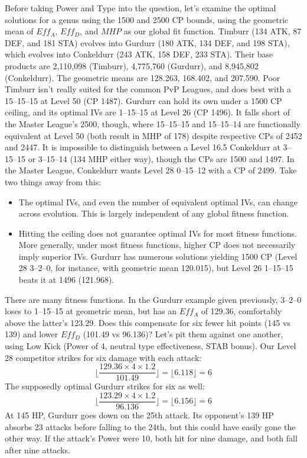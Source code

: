 Before taking Power and Type into the question, let's examine the optimal
 solutions for a genus using the 1500 and 2500 CP bounds, using the
 geometric mean of $Eff_A$, $Eff_D$, and $MHP$ as our global fit function.
Timburr (134 ATK, 87 DEF, and 181 STA) evolves into
  Gurdurr (180 ATK, 134 DEF, and 198 STA), which evolves into
  Conkeldurr (243 ATK, 158 DEF, 233 STA).
Their base products are 2,110,098 (Timburr), 4,775,760 (Gurdurr),
  and 8,945,802 (Conkeldurr).
The geometric means are 128.263, 168.402, and 207.590.
Poor Timburr isn't really suited for the common PvP Leagues,
  and does best with a 15--15--15 at Level 50 (CP 1487).
Gurdurr can hold its own under a 1500 CP ceiling, and its
  optimal IVs are 1--15--15 at Level 26 (CP 1496).
It falls short of the Master League's 2500, though, where
  15--15--15 and 15--15--14 are functionally equivalent
  at Level 50 (both result in MHP of 178) despite
  respective CPs of 2452 and 2447.
It is impossible to distinguish between a Level 16.5 Conkeldurr at
  3--15--15 or 3--15--14 (134 MHP either way), though
  the CPs are 1500 and 1497.
In the Master League, Conkeldurr wants Level 28 0--15--12 with
  a CP of 2499.
Take two things away from this:
\begin{itemize}
\item The optimal IVs, and even the number of equivalent optimal IVs, can change across evolution.
  This is largely independent of any global fitness function.
\item Hitting the ceiling does not guarantee optimal IVs for most fitness functions.
  More generally, under most fitness functions, higher CP does not necessarily imply superior IVs.
    Gurdurr has numerous solutions yielding 1500 CP (Level 28 3--2--0, for instance, with geometric
    mean 120.015), but Level 26 1--15--15 beats it at 1496 (121.968).
\end{itemize}
There are many fitness functions. In the Gurdurr example given previously, 3--2--0 loses
    to 1--15--15 at geometric mean, but has an $Eff_A$ of 129.36, comfortably above the latter's 123.29.
 Does this compensate for six fewer hit points (145 vs 139) and lower $Eff_D$ (101.49 vs 96.136)?
 Let's pit them against one another, using Low Kick (Power of 4, neutral type effectiveness, STAB bonus).
 Our Level 28 competitor strikes for six damage with each attack:
    \[ \lfloor \frac{129.36 \times 4 \times 1.2}{101.49} \rfloor = \lfloor 6.118 \rfloor = 6 \]
 The supposedly optimal Gurdurr strikes for six as well:
    \[ \lfloor \frac{123.29 \times 4 \times 1.2}{96.136} \rfloor = \lfloor 6.156 \rfloor = 6 \]
 At 145 HP, Gurdurr goes down on the 25th attack.
 Its opponent's 139 HP absorbs 23 attacks before falling to the 24th, but this could
    have easily gone the other way.
 If the attack's Power were 10, both hit for nine damage, and both fall after nine attacks.

